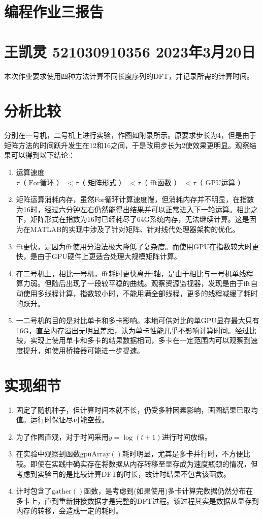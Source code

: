\documentclass[a4paper]{article}
\begin{document}
	\section*{\Huge 编程作业三报告}
	\section*{\small 王凯灵 521030910356 2023年3月20日}
	本次作业要求使用四种方法计算不同长度序列的DFT，并记录所需的计算时间。
	
	\section*{分析比较}
	分别在一号机，二号机上进行实验，作图如附录所示。原要求步长为4，但是由于矩阵方法的时间跃升发生在12和16之间，于是改用步长为2使效果更明显。观察结果可以得到以下结论：
	\begin{enumerate}
		\item 运算速度$\tau\text{（ For循环 ） }<\tau\text{（ 矩阵形式 ） }<\tau\text{（ fft函数 ） }<\tau\text{（ GPU运算 ） }$
		\item 矩阵运算消耗内存，虽然For循环计算速度慢，但消耗内存并不明显，在指数为16时，经过六分钟左右仍然能得出结果并可以正常进入下一轮运算。相比之下，矩阵形式在指数为16时已经耗尽了64G系统内存，无法继续计算。这是因为在MATLAB的实现中涉及了针对矩阵、针对线代处理器架构的优化。
		\item fft更快，是因为fft使用分治法极大降低了复杂度。而使用GPU在指数较大时更快，是由于GPU硬件上更适合处理大规模矩阵计算。
		\item 在二号机上，相比一号机，fft耗时更快离开t轴，是由于相比与一号机单线程算力弱。但随后出现了一段较平稳的曲线。观察资源监视器，发现是由于fft自动使用多线程计算，指数较小时，不能用满全部线程，更多的线程减缓了耗时的跃升。
		\item 一二号机的目的是对比单卡和多卡影响。本地可供对比的单GPU显存最大只有16G，直至内存溢出无明显差距，认为单卡性能几乎不影响计算时间。经过比较，实现上使用单卡和多卡的结果数据相同，多卡在一定范围内可以观察到速度提升，如使用桥接器可能进一步提速。
	\end{enumerate}
	
	\section*{实现细节}
	\begin{enumerate}
		\item 固定了随机种子，但计算时间本就不长，仍受多种因素影响，画图结果已取均值。运行时保证尽可能空载。
		\item 为了作图直观，对于时间采用$y=\log(t+1)$进行时间放缩。
		\item 在实验中观察到函数$\operatorname{gpuArray()}$耗时明显，尤其是多卡并行时，不方便比较。即使在实践中确实存在将数据从内存转移至显存成为速度瓶颈的情况，但考虑到实验目的是比较计算DFT的时长，故计时结果不包含该函数。
		\item 计时包含了$\operatorname{gather()}$函数，是考虑到(如果使用)多卡计算完数据仍然分布在多卡上，直到重新拼接数据才是完整的DFT过程。该过程其实是数据从显存到内存的转移，会造成一定的耗时。
	\end{enumerate}
	\newpage
\end{document}
